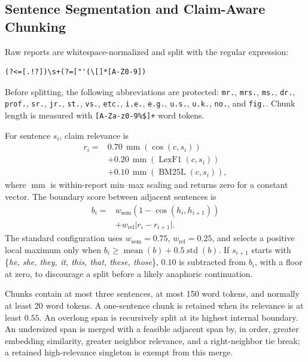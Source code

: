 \subsection{Sentence Segmentation and Claim-Aware Chunking}
\label{supp:chunking}

Raw reports are whitespace-normalized and split with the regular expression:
\begin{lstlisting}
(?<=[.!?])\s+(?=["'(\[]*[A-Z0-9])
\end{lstlisting}
Before splitting, the following abbreviations are protected:
\texttt{mr.}, \texttt{mrs.}, \texttt{ms.}, \texttt{dr.}, \texttt{prof.},
\texttt{sr.}, \texttt{jr.}, \texttt{st.}, \texttt{vs.}, \texttt{etc.},
\texttt{i.e.}, \texttt{e.g.}, \texttt{u.s.}, \texttt{u.k.}, \texttt{no.},
and \texttt{fig.}.  Chunk length is measured with
\texttt{[A-Za-z0-9\%\$]+} word tokens.

For sentence \(s_i\), claim relevance is
\begin{equation}
\begin{aligned}
r_i={}&0.70\,\operatorname{mm}(\operatorname{cos}(c,s_i))\\
&+0.20\,\operatorname{mm}(\operatorname{LexF1}(c,s_i))\\
&+0.10\,\operatorname{mm}(\operatorname{BM25L}(c,s_i)),
\end{aligned}
\label{eq:supp-sentence-relevance}
\end{equation}
where \(\operatorname{mm}\) is within-report min--max scaling and returns zero
for a constant vector.  The boundary score between adjacent sentences is
\begin{equation}
\begin{aligned}
b_i={}&w_{\mathrm{sem}}
\left(1-\operatorname{cos}(h_i,h_{i+1})\right)\\
&+w_{\mathrm{rel}}\lvert r_i-r_{i+1}\rvert .
\end{aligned}
\label{eq:supp-boundary}
\end{equation}
The standard configuration uses
\(w_{\mathrm{sem}}=0.75\), \(w_{\mathrm{rel}}=0.25\), and selects a positive
local maximum only when
\(b_i\geq \operatorname{mean}(b)+0.5\operatorname{std}(b)\).
If \(s_{i+1}\) starts with
\{\textit{he, she, they, it, this, that, these, those}\}, \(0.10\) is
subtracted from \(b_i\), with a floor at zero, to discourage a split before a
likely anaphoric continuation.

Chunks contain at most three sentences, at most 150 word tokens, and normally
at least 20 word tokens.  A one-sentence chunk is retained when its relevance
is at least \(0.55\).  An overlong span is recursively split at its highest
internal boundary.  An undersized span is merged with a feasible adjacent
span by, in order, greater embedding similarity, greater neighbor relevance,
and a right-neighbor tie break; a retained high-relevance singleton is exempt
from this merge.

